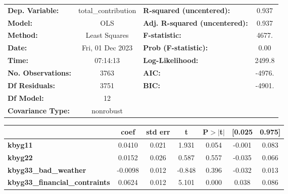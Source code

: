 \begin{center}
\begin{tabular}{lclc}
\toprule
\textbf{Dep. Variable:}                      & total\_contribution & \textbf{  R-squared (uncentered):}      &     0.937   \\
\textbf{Model:}                              &         OLS         & \textbf{  Adj. R-squared (uncentered):} &     0.937   \\
\textbf{Method:}                             &    Least Squares    & \textbf{  F-statistic:       }          &     4677.   \\
\textbf{Date:}                               &   Fri, 01 Dec 2023  & \textbf{  Prob (F-statistic):}          &     0.00    \\
\textbf{Time:}                               &       07:14:13      & \textbf{  Log-Likelihood:    }          &    2499.8   \\
\textbf{No. Observations:}                   &          3763       & \textbf{  AIC:               }          &    -4976.   \\
\textbf{Df Residuals:}                       &          3751       & \textbf{  BIC:               }          &    -4901.   \\
\textbf{Df Model:}                           &            12       & \textbf{                     }          &             \\
\textbf{Covariance Type:}                    &      nonrobust      & \textbf{                     }          &             \\
\bottomrule
\end{tabular}
\begin{tabular}{lcccccc}
                                             & \textbf{coef} & \textbf{std err} & \textbf{t} & \textbf{P$> |$t$|$} & \textbf{[0.025} & \textbf{0.975]}  \\
\midrule
\textbf{kbyg11}                              &       0.0410  &        0.021     &     1.931  &         0.054        &       -0.001    &        0.083     \\
\textbf{kbyg22}                              &       0.0152  &        0.026     &     0.587  &         0.557        &       -0.035    &        0.066     \\
\textbf{kbyg33\_bad\_weather}                &      -0.0098  &        0.012     &    -0.848  &         0.396        &       -0.032    &        0.013     \\
\textbf{kbyg33\_financial\_contraints}       &       0.0624  &        0.012     &     5.101  &         0.000        &        0.038    &        0.086     \\

\end{tabular}
\end{center}
